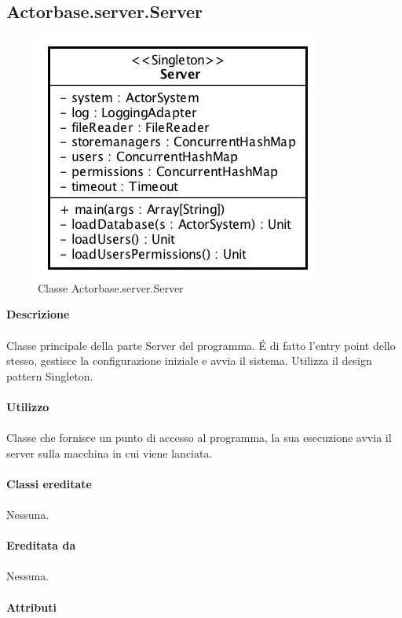 \documentclass[a4paper]{article}
\begin{document}
	\subsection{Actorbase.server.Server}
		\begin{figure}[H]
			\centering
			\includegraphics[scale=0.5]{Server/serverClass.jpg}
			\caption{Classe Actorbase.server.Server}
		\end{figure}
		\textbf{Descrizione}
			\\ \\
			Classe principale della parte Server del programma. \'E di fatto l'entry point dello stesso, gestisce la configurazione iniziale e avvia il sistema. Utilizza il design pattern Singleton.
			\\ \\
		\textbf{Utilizzo}
			\\ \\
			Classe che fornisce un punto di accesso al programma, la sua esecuzione avvia il server sulla macchina in cui viene lanciata.
			\\ \\
		\textbf{Classi ereditate}
			\\ \\
			Nessuna.
			\\ \\
		\textbf{Ereditata da}
			\\ \\
			Nessuna.
			\\ \\
		\textbf{Attributi}
\end{document}
